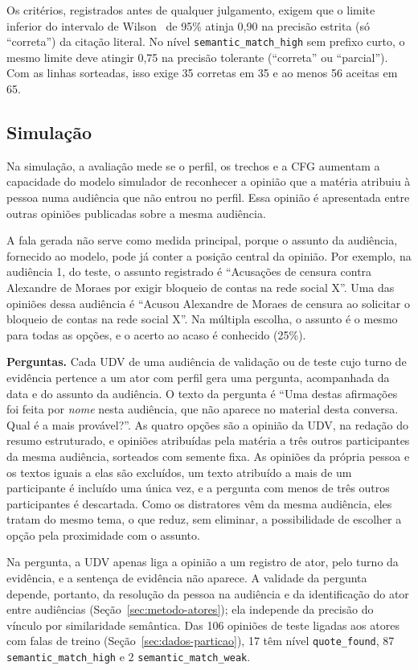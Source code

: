 Os critérios, registrados antes de qualquer julgamento, exigem que o limite inferior do intervalo de
Wilson~\citep{wilson1927probable} de 95\% atinja 0,90 na precisão estrita (só ``correta'') da citação
literal. No nível \texttt{semantic\_match\_high} sem prefixo curto, o mesmo limite deve atingir 0,75
na precisão tolerante (``correta'' ou ``parcial''). Com as linhas sorteadas, isso exige 35 corretas
em 35 e ao menos 56 aceitas em 65.

\subsection{Simulação}
\label{sec:setup-simulacao}

Na simulação, a avaliação mede se o perfil, os trechos e a CFG aumentam a capacidade do modelo
simulador de reconhecer a opinião que a matéria atribuiu à pessoa numa audiência que não entrou no
perfil. Essa opinião é apresentada entre outras opiniões publicadas sobre a mesma audiência.

A fala gerada não serve como medida principal, porque o assunto da audiência, fornecido ao modelo,
pode já conter a posição central da opinião. Por exemplo, na audiência 1, do teste, o assunto
registrado é ``Acusações de censura contra Alexandre de Moraes por exigir bloqueio de contas na
rede social X''. Uma das opiniões dessa audiência é ``Acusou Alexandre de Moraes de censura ao
solicitar o bloqueio de contas na rede social X''. Na múltipla escolha, o assunto é o mesmo para
todas as opções, e o acerto ao acaso é conhecido (25\%).

\textbf{Perguntas.} Cada UDV de uma audiência de validação ou de teste cujo turno de evidência
pertence a um ator com perfil gera uma pergunta, acompanhada da data e do assunto da audiência. O
texto da pergunta é ``Uma destas afirmações foi feita por \textit{nome} nesta audiência, que não
aparece no material desta conversa. Qual é a mais provável?''. As quatro opções são a opinião da
UDV, na redação do resumo estruturado, e opiniões atribuídas pela matéria a três outros participantes
da mesma audiência, sorteados com semente fixa. As opiniões da própria pessoa e os textos iguais a
elas são excluídos, um texto atribuído a mais de um participante é incluído uma única vez, e a
pergunta com menos de três outros participantes é descartada. Como os distratores vêm da mesma
audiência, eles tratam do mesmo tema, o que reduz, sem eliminar, a possibilidade de escolher a opção
pela proximidade com o assunto.

Na pergunta, a UDV apenas liga a opinião a um registro de ator, pelo turno da evidência, e a
sentença de evidência não aparece. A validade da pergunta depende, portanto, da resolução da pessoa
na audiência e da identificação do ator entre audiências (Seção~\ref{sec:metodo-atores}); ela
independe da precisão do vínculo por similaridade semântica. Das 106 opiniões de teste ligadas aos
atores com falas de treino (Seção~\ref{sec:dados-particao}), 17 têm nível \texttt{quote\_found}, 87
\texttt{semantic\_match\_high} e 2 \texttt{semantic\_match\_weak}.

